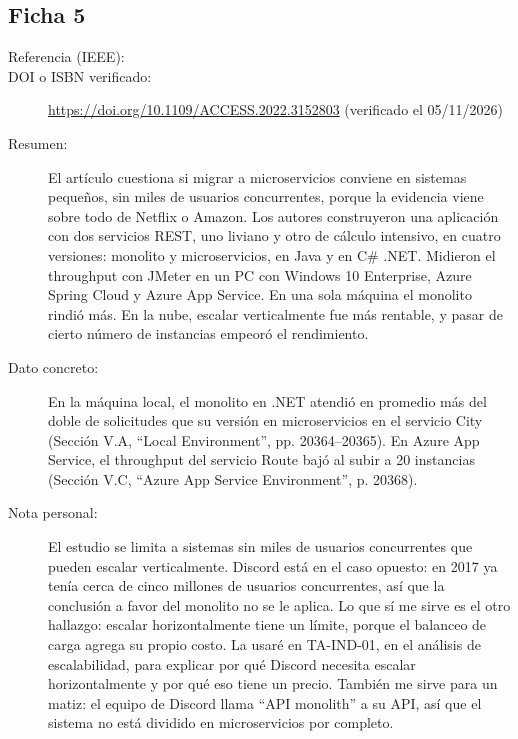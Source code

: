 \subsection{Ficha 5}
\begin{description}
  \item[Referencia (IEEE):] 
  \item[DOI o ISBN verificado:] \url{https://doi.org/10.1109/ACCESS.2022.3152803} (verificado el 05/11/2026)
  \item[Resumen:] El artículo cuestiona si migrar a microservicios conviene en sistemas pequeños, sin miles de usuarios concurrentes, porque la evidencia viene sobre todo de Netflix o Amazon. Los autores construyeron una aplicación con dos servicios REST, uno liviano y otro de cálculo intensivo, en cuatro versiones: monolito y microservicios, en Java y en C\# .NET. Midieron el throughput con JMeter en un PC con Windows 10 Enterprise, Azure Spring Cloud y Azure App Service. En una sola máquina el monolito rindió más. En la nube, escalar verticalmente fue más rentable, y pasar de cierto número de instancias empeoró el rendimiento.
  \item[Dato concreto:] En la máquina local, el monolito en .NET atendió en promedio más del doble de solicitudes que su versión en microservicios en el servicio City (Sección V.A, \enquote{Local Environment}, pp. 20364–20365). En Azure App Service, el throughput del servicio Route bajó al subir a 20 instancias (Sección V.C, \enquote{Azure App Service Environment}, p. 20368).
  \item[Nota personal:] El estudio se limita a sistemas sin miles de usuarios concurrentes que pueden escalar verticalmente. Discord está en el caso opuesto: en 2017 ya tenía cerca de cinco millones de usuarios concurrentes, así que la conclusión a favor del monolito no se le aplica. Lo que sí me sirve es el otro hallazgo: escalar horizontalmente tiene un límite, porque el balanceo de carga agrega su propio costo. La usaré en TA-IND-01, en el análisis de escalabilidad, para explicar por qué Discord necesita escalar horizontalmente y por qué eso tiene un precio. También me sirve para un matiz: el equipo de Discord llama \enquote{API monolith} a su API, así que el sistema no está dividido en microservicios por completo.
\end{description}
